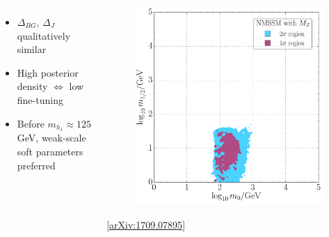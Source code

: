 \documentclass[10pt,aspectratio=169]{beamer}
\begin{document}
\begin{frame}
\begin{columns}[t]
\begin{column}{0.6\textwidth}
\begin{columns}[t]
\begin{column}{0.5\textwidth}
\begin{figure}
          \end{figure}
        \end{column}
      \end{columns}
      \vspace{10pt}
      \begin{minipage}[t][5cm][t]{\textwidth}
      \begin{itemize} \itemsep1em
        \item $\Delta_{BG}$, $\Delta_J$ qualitatively similar
        \item High posterior density $\Leftrightarrow$ low fine-tuning
        \item Before $m_{h_1} \approx 125$ GeV, weak-scale soft parameters
          preferred
      \end{itemize}
    \end{minipage}
    \end{column}
    \begin{column}{0.35\textwidth}
      \begin{figure}
        \centering
        \includegraphics[width=\textwidth]{CNMSSM_pdf_mz_m0m12}
      \end{figure}
      \vspace*{-20pt}
      \begin{center}
        {\tiny [\href{https://arxiv.org/abs/1709.07895}{arXiv:1709.07895}]}
      \end{center}
    \end{column}
  \end{columns}
\end{frame}
\end{document}

